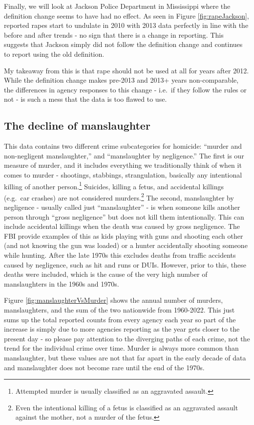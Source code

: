 \documentclass[
]{krantz}
\begin{document}
Finally, we will look at Jackson Police Department in
Mississippi where the definition change seems to have had no
effect. As seen in Figure \ref{fig:rapeJackson}, reported
rapes start to undulate in 2010 with 2013 data perfectly in
line with the before and after trends - no sign that there
is a change in reporting. This suggests that Jackson simply
did not follow the definition change and continues to report
using the old definition.

My takeaway from this is that rape should not be used at all
for years after 2012. While the definition change makes
pre-2013 and 2013+ years non-comparable, the differences in
agency responses to this change - i.e.~if they follow the
rules or not - is such a mess that the data is too flawed to
use.

\subsection{The decline of
manslaughter}\label{the-decline-of-manslaughter}

This data contains two different crime subcategories for
homicide: ``murder and non-negligent manslaughter,'' and
``manslaughter by negligence.'' The first is our measure of
murder, and it includes everything we traditionally think of
when it comes to murder - shootings, stabbings,
strangulation, basically any intentional killing of another
person.\footnote{Attempted murder is usually classified as
  an aggravated assault.} Suicides, killing a fetus, and
accidental killings (e.g.~car crashes) are not considered
murders.\footnote{Even the intentional killing of a fetus is
  classified as an aggravated assault against the mother,
  not a murder of the fetus.} The second, manslaughter by
negligence - usually called just ``manslaughter'' - is when
someone kills another person through ``gross negligence''
but does not kill them intentionally. This can include
accidental killings when the death was caused by gross
negligence. The FBI provide examples of this as kids playing
with guns and shooting each other (and not knowing the gun
was loaded) or a hunter accidentally shooting someone while
hunting. After the late 1970s this excludes deaths from
traffic accidents caused by negligence, such as hit and runs
or DUIs. However, prior to this, these deaths were included,
which is the cause of the very high number of manslaughters
in the 1960s and 1970s.

Figure \ref{fig:manslaughterVsMurder} shows the annual
number of murders, manslaughters, and the sum of the two
nationwide from 1960-2022. This just sums up the total
reported counts from every agency each year so part of the
increase is simply due to more agencies reporting as the
year gets closer to the present day - so please pay
attention to the diverging paths of each crime, not the
trend for the individual crime over time. Murder is always
more common than manslaughter, but these values are not that
far apart in the early decade of data and manslaughter does
not become rare until the end of the 1970s.
\end{document}
